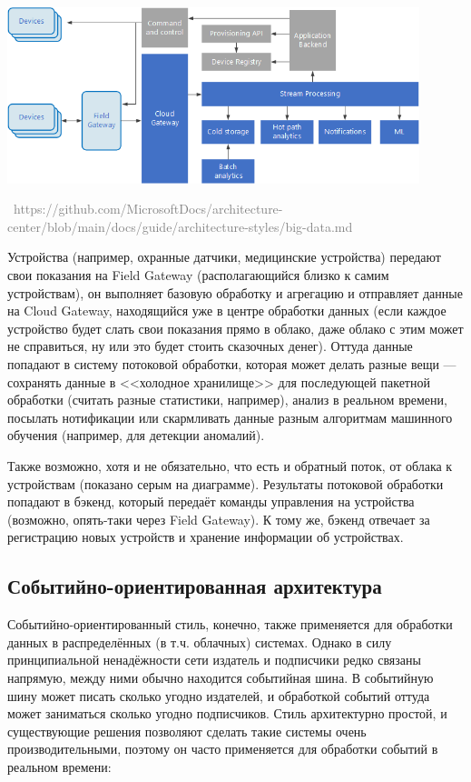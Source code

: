 \documentclass[a5paper]{article}
\newcommand{\attribution}[1] {
    \vspace{-5mm}\begin{flushright}\begin{scriptsize}\textcolor{gray}{\textcopyright\, #1}\end{scriptsize}\end{flushright}
}
\begin{document}
\begin{center}
    \includegraphics[width=0.9\textwidth]{iot.png}
    \attribution{https://github.com/MicrosoftDocs/architecture-center/blob/main/docs/guide/architecture-styles/big-data.md}
\end{center}

Устройства (например, охранные датчики, медицинские устройства) передают свои показания на Field Gateway (располагающийся близко к самим устройствам), он выполняет базовую обработку и агрегацию и отправляет данные на Cloud Gateway, находящийся уже в центре обработки данных (если каждое устройство будет слать свои показания прямо в облако, даже облако с этим может не справиться, ну или это будет стоить сказочных денег). Оттуда данные попадают в систему потоковой обработки, которая может делать разные вещи --- сохранять данные в <<холодное хранилище>> для последующей пакетной обработки (считать разные статистики, например), анализ в реальном времени, посылать нотификации или скармливать данные разным алгоритмам машинного обучения (например, для детекции аномалий).

Также возможно, хотя и не обязательно, что есть и обратный поток, от облака к устройствам (показано серым на диаграмме). Результаты потоковой обработки попадают в бэкенд, который передаёт команды управления на устройства (возможно, опять-таки через Field Gateway). К тому же, бэкенд отвечает за регистрацию новых устройств и хранение информации об устройствах.

\subsection{Событийно-ориентированная архитектура}

Событийно-ориентированный стиль, конечно, также применяется для обработки данных в распределённых (в т.ч. облачных) системах. Однако в силу принципиальной ненадёжности сети издатель и подписчики редко связаны напрямую, между ними обычно находится событийная шина. В событийную шину может писать сколько угодно издателей, и обработкой событий оттуда может заниматься сколько угодно подписчиков. Стиль архитектурно простой, и существующие решения позволяют сделать такие системы очень производительными, поэтому он часто применяется для обработки событий в реальном времени:
\end{document}

